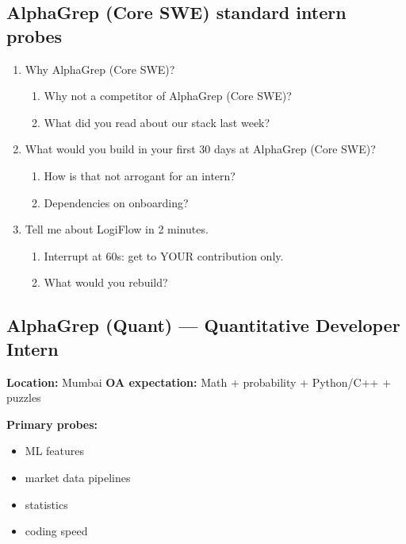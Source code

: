 \documentclass[9pt,a4paper]{article}
\begin{document}
\subsection{AlphaGrep (Core SWE) standard intern probes}
\begin{enumerate}[label=\textbf{Q\arabic*:}, leftmargin=*]
  \item Why AlphaGrep (Core SWE)?
  \begin{enumerate}[label=\textit{FU\arabic*:}, leftmargin=2em]
    \item Why not a competitor of AlphaGrep (Core SWE)?
    \item What did you read about our stack last week?
  \end{enumerate}
  \item What would you build in your first 30 days at AlphaGrep (Core SWE)?
  \begin{enumerate}[label=\textit{FU\arabic*:}, leftmargin=2em]
    \item How is that not arrogant for an intern?
    \item Dependencies on onboarding?
  \end{enumerate}
  \item Tell me about LogiFlow in 2 minutes.
  \begin{enumerate}[label=\textit{FU\arabic*:}, leftmargin=2em]
    \item Interrupt at 60s: get to YOUR contribution only.
    \item What would you rebuild?
  \end{enumerate}
\end{enumerate}
\newpage
\subsection{AlphaGrep (Quant) --- Quantitative Developer Intern}
\textbf{Location:} Mumbai \quad \textbf{OA expectation:} Math + probability + Python/C++ + puzzles

\textbf{Primary probes:}
\begin{itemize}
  \item ML features
  \item market data pipelines
  \item statistics
  \item coding speed
\end{itemize}
\end{document}
